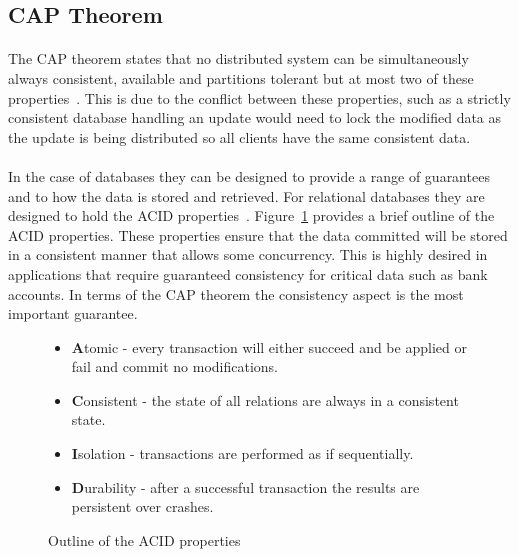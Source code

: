 \documentclass{CRPITStyle}
\renewcommand{\cite}{\citep}
\begin{document}
\subsection{CAP Theorem}

\paragraph{}
The CAP theorem states that no distributed system can be
simultaneously always consistent, available and
partitions tolerant but at most two of these properties~\cite{base,nosql_db,compare_nosql,nosql_survey}.
This is due to the conflict between these properties, such as a
strictly consistent database handling an update would
need to lock the modified data as the update is being distributed
so all clients have the same consistent data.


\paragraph{}
In the case of databases they can be designed to provide a
range of guarantees and to how the data is stored and retrieved.
For relational databases they are designed to hold
the ACID properties~\cite{relational_db,base}.
Figure~\ref{l:acid} provides a brief outline of the ACID properties.
These properties ensure that the data committed will be stored in a
consistent manner that allows some concurrency.
This is highly desired in applications that require guaranteed consistency
for critical data such as bank accounts.
In terms of the CAP theorem the consistency aspect is the most important
guarantee.

\begin{figure}
\begin{itemize}
    \item \textbf{A}tomic - every transaction will either
        succeed and be applied or fail and commit no modifications.
    \item \textbf{C}onsistent - the state of all relations are
        always in a consistent state.
    \item \textbf{I}solation - transactions are performed as if sequentially.
    \item \textbf{D}urability - after a successful transaction the results
        are persistent over crashes.
\end{itemize}
    \caption{Outline of the ACID properties~\cite{relational_db,base}}\label{l:acid}
\end{figure}
%
\end{document}
